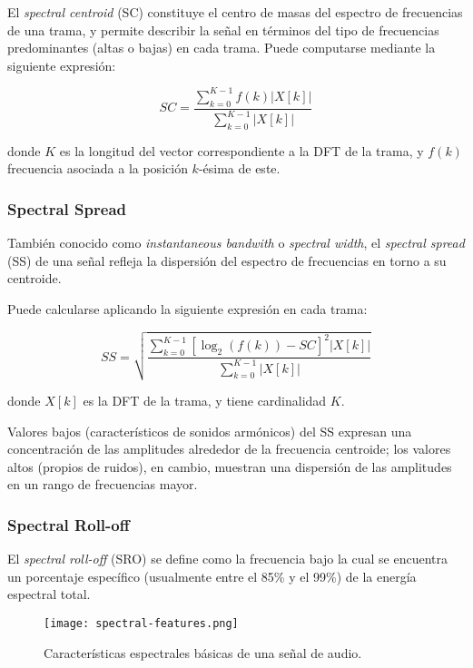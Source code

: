 El \textit{spectral centroid} (SC) constituye el centro de masas del espectro de frecuencias de una trama, y permite describir la señal en términos del tipo de frecuencias predominantes (altas o bajas) en cada trama.
Puede computarse mediante la siguiente expresión:

\begin{equation}
    \label{eq:SC}
    SC = \frac{\sum_{k=0}^{K-1}{f(k)|X[k]|}}{\sum_{k=0}^{K-1}{|X[k]|}}
\end{equation}

\noindent
donde $K$ es la longitud del vector correspondiente a la DFT de la trama, y $f(k)$ frecuencia asociada a la posición $k$-ésima de este.

\subsubsection{Spectral Spread}

También conocido como \textit{instantaneous bandwith} o \textit{spectral width}, el \textit{spectral spread} (SS) de una señal refleja la dispersión del espectro de frecuencias en torno a su centroide.

Puede calcularse aplicando la siguiente expresión en cada trama:

\begin{equation}
    \label{eq:SS}
    SS = \sqrt{\frac{\sum_{k=0}^{K-1}{\left[ \log_{2}{(f(k))-SC} \right]^2 |X[k]|}}{\sum_{k=0}^{K-1}{|X[k]|}}}
\end{equation}

\noindent
donde $X[k]$ es la DFT de la trama, y tiene cardinalidad $K$.

Valores bajos (característicos de sonidos armónicos) del SS expresan una concentración de las amplitudes alrededor de la frecuencia centroide;
los valores altos (propios de ruidos), en cambio, muestran una dispersión de las amplitudes en un rango de frecuencias mayor.

\subsubsection{Spectral Roll-off}

El \textit{spectral roll-off} (SRO) se define como la frecuencia bajo la cual se encuentra un porcentaje específico (usualmente entre el 85\% y el 99\%) de la energía espectral total.

\begin{figure}[!h]
    \centering
    \texttt{[image: spectral-features.png]}
    \caption{Características espectrales básicas de una señal de audio.}
    \label{img:basic-spectral-descriptors}
\end{figure}

